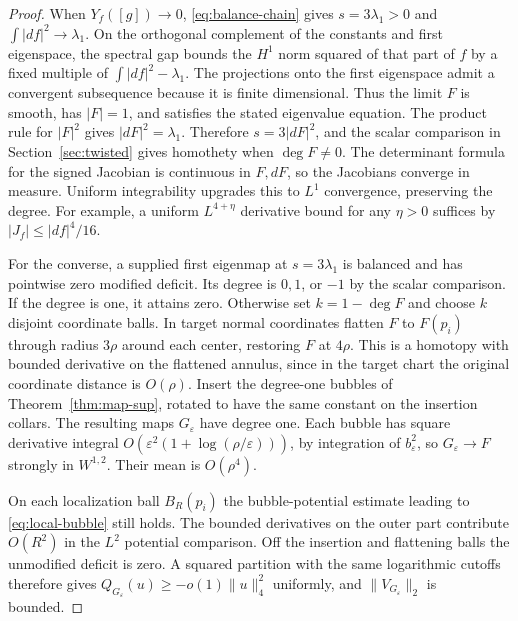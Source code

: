 \documentclass[11pt]{article}
\numberwithin{equation}{section}
\newcommand{\e}{\varepsilon}
\newcommand{\abs}[1]{\lvert #1\rvert}
\newcommand{\norm}[1]{\lVert #1\rVert}
\newcommand{\Yf}{Y_f([g])}
\begin{document}
\begin{proof}
When \(\Yf\to0\), \eqref{eq:balance-chain} gives
\(s=3\lambda_1>0\) and \(\int\abs{df}^2\to\lambda_1\).
On the orthogonal complement of the constants and first
eigenspace, the spectral gap bounds the \(H^1\) norm squared
of that part of \(f\) by a fixed multiple of
\(\int\abs{df}^2-\lambda_1\). The projections onto the first
eigenspace admit a convergent subsequence because it is finite
dimensional. Thus the limit \(F\) is smooth, has \(\abs F=1\),
and satisfies the stated eigenvalue equation. The product rule
for \(\abs F^2\) gives \(\abs{dF}^2=\lambda_1\). Therefore
\(s=3\abs{dF}^2\), and the scalar comparison in
Section~\ref{sec:twisted} gives homothety when \(\deg F\ne0\).
The determinant formula for the signed Jacobian is continuous
in \(F,dF\), so the Jacobians converge in measure.
Uniform integrability upgrades this to \(L^1\) convergence,
preserving the degree. For example, a uniform \(L^{4+\eta}\)
derivative bound for any \(\eta>0\) suffices by
\(\abs{J_f}\le\abs{df}^4/16\).

For the converse, a supplied first eigenmap at \(s=3\lambda_1\)
is balanced and has pointwise zero modified deficit. Its degree
is \(0,1\), or \(-1\) by the scalar comparison. If the degree
is one, it attains zero. Otherwise set \(k=1-\deg F\) and
choose \(k\) disjoint coordinate balls.
In target normal coordinates flatten \(F\) to \(F(p_i)\) through
radius \(3\rho\) around each center, restoring \(F\) at \(4\rho\).
This is a homotopy with bounded derivative on the flattened
annulus, since in the target chart the original coordinate
distance is \(O(\rho)\). Insert the degree-one bubbles of
Theorem~\ref{thm:map-sup}, rotated to have the same constant
on the insertion collars. The resulting maps \(G_\e\) have
degree one. Each bubble has square derivative integral
\(O(\e^2(1+\log(\rho/\e)))\), by integration of \(b_\e^2\),
so \(G_\e\to F\) strongly in \(W^{1,2}\).
Their mean is \(O(\rho^4)\).

On each localization ball \(B_R(p_i)\) the bubble-potential
estimate leading to \eqref{eq:local-bubble} still holds. The
bounded derivatives on the outer part contribute \(O(R^2)\)
in the \(L^2\) potential comparison. Off the insertion and
flattening balls the unmodified deficit is zero. A squared
partition with the same logarithmic cutoffs therefore gives
\(Q_{G_\e}(u)\ge-o(1)\norm u_4^2\) uniformly, and
\(\norm{V_{G_\e}}_2\) is bounded.


\end{proof}
\end{document}
